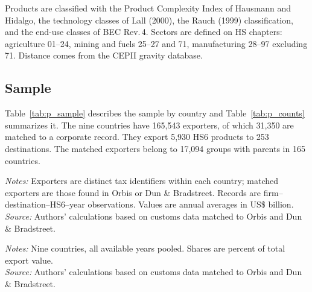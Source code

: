 \documentclass[11pt,a4paper]{article}
\begin{document}
Products are classified with the Product Complexity Index of Hausmann and Hidalgo, the technology
classes of Lall (2000), the Rauch (1999) classification, and the end-use classes of BEC Rev.\,4.
Sectors are defined on HS chapters: agriculture 01--24, mining and fuels 25--27 and 71,
manufacturing 28--97 excluding 71. Distance comes from the CEPII gravity database.

\subsection{Sample}

Table~\ref{tab:p_sample} describes the sample by country and Table~\ref{tab:p_counts} summarizes
it. The nine countries have 165,543 exporters, of which 31,350 are matched to a corporate record.
They export 5,930 HS6 products to 253 destinations. The matched exporters belong to 17,094 groups
with parents in 165 countries.

\begin{table}[H]\centering\footnotesize%
  \caption{Sample Coverage, by Exporting Country}%
  \label{tab:p_sample}%
  \par\vspace{3pt}%
  \begin{minipage}{0.95\textwidth}\footnotesize %
  \textit{Notes:} Exporters are distinct tax identifiers within each country; matched exporters are those found in Orbis or Dun \& Bradstreet. Records are firm--destination--HS6--year observations. Values are annual averages in US\$ billion.\\[3pt]%
  \textit{Source:} Authors' calculations based on customs data matched to Orbis and Dun \& Bradstreet.%
  \end{minipage}%
  \end{table}
\begin{table}[H]\centering\small%
  \caption{Sample Summary}%
  \label{tab:p_counts}%
  \par\vspace{3pt}%
  \begin{minipage}{0.95\textwidth}\footnotesize %
  \textit{Notes:} Nine countries, all available years pooled. Shares are percent of total export value.\\[3pt]%
  \textit{Source:} Authors' calculations based on customs data matched to Orbis and Dun \& Bradstreet.%
  \end{minipage}%
  \end{table}
\end{document}
